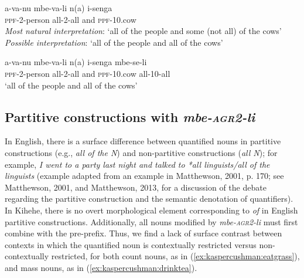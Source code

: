 \documentclass[output=paper,modfonts,nonflat]{langsci/langscibook}
\begin{document}
\begin{exe}

\ex \begin{xlist}

\ex 
\gll a-va-nu mbe-va-li n(a) i-senga \\
\textsc{ppf}-2-person all-2-all and \textsc{ppf}-10.cow \\
\textit{Most natural interpretation}: `all of the people and some (not all) of the cows' \\
\textit{Possible interpretation}: `all of the people and all of the cows' \\

\vspace{2mm}

\ex 
\gll a-va-nu mbe-va-li n(a) i-senga mbe-se-li \\
\textsc{ppf}-2-person all-2-all and \textsc{ppf}-10.cow all-10-all \\
\glt `all of the people and all of the cows' 

\end{xlist}
\end{exe}

\subsection{Partitive constructions with \emph{mbe-\textsc{agr2}-li}}

In English, there is a surface difference between quantified nouns in partitive constructions (e.g., \textit{all of the N}) and non-partitive constructions (\textit{all N}); for example, \textit{I went to a party last night and talked to *all linguists/all of the linguists} (example adapted from an example in Matthewson, 2001, p. 170; see Matthewson, 2001, and Matthewson, 2013, for a discussion of the debate regarding the partitive construction and the semantic denotation of quantifiers). In Kihehe, there is no overt morphological element corresponding to \textit{of} in English partitive constructions. Additionally, all nouns modified by \emph{mbe-\textsc{agr2}-li} must first combine with the pre-prefix.  Thus, we find a lack of surface contrast between contexts in which the quantified noun is contextually restricted versus non-contextually restricted, for both count nouns, as in (\ref{ex:kaspercushman:eatgrass}), and mass nouns, as in (\ref{ex:kaspercushman:drinktea}).
\end{document}
